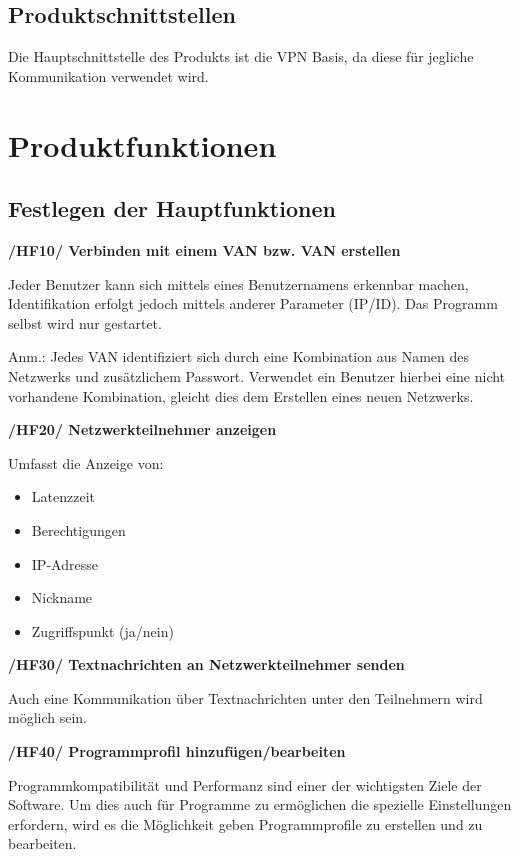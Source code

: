 \documentclass[a4paper,12pt]{scrreprt}
\begin{document}
	\section{Produktschnittstellen}
		
		Die Hauptschnittstelle des Produkts ist die VPN Basis, da diese für jegliche Kommunikation verwendet wird. 
		
\chapter{Produktfunktionen}
		\section{Festlegen der Hauptfunktionen}
			\textbf{/HF10/ Verbinden mit einem VAN bzw. VAN erstellen}
			
			Jeder Benutzer kann sich mittels eines Benutzernamens erkennbar machen, Identifikation erfolgt jedoch mittels anderer Parameter (IP/ID). Das Programm selbst wird nur gestartet.
			
			Anm.: Jedes VAN identifiziert sich durch eine Kombination aus Namen des Netzwerks und zusätzlichem Passwort. Verwendet ein Benutzer hierbei eine nicht vorhandene Kombination, gleicht dies dem Erstellen eines neuen Netzwerks. 
			
			
			\textbf { /HF20/ Netzwerkteilnehmer anzeigen
			}
					
			Umfasst die Anzeige von:
			\begin{itemize}
			
		
			\item Latenzzeit
			\item Berechtigungen
			\item IP-Adresse
			\item Nickname
			\item Zugriffspunkt (ja/nein)\\
				\end{itemize}
			
			
			
			
			
			\textbf {/HF30/ Textnachrichten an Netzwerkteilnehmer senden}
			
			
			Auch eine Kommunikation über Textnachrichten unter den Teilnehmern wird möglich sein.
			
			 \textbf {/HF40/ Programmprofil hinzufügen/bearbeiten}
			
			Programmkompatibilität und Performanz sind einer der wichtigsten Ziele der Software. Um dies auch für Programme zu ermöglichen die spezielle Einstellungen erfordern, wird es die Möglichkeit geben Programmprofile zu erstellen und zu bearbeiten.
			
\end{document}
